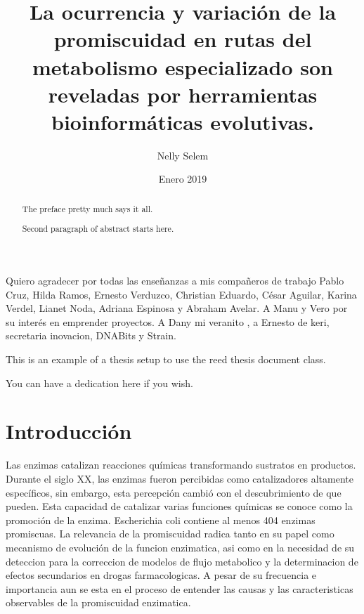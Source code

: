 \documentclass[12pt,twoside]{reedthesis}
\title{La ocurrencia y variación de la promiscuidad en rutas del metabolismo
especializado son reveladas por herramientas bioinformáticas evolutivas.}
\author{Nelly Selem}
\date{Enero 2019}
\begin{document}
      \maketitle
  
  \frontmatter %
  \pagestyle{empty} %

      \begin{acknowledgements}
      Quiero agradecer por todas las enseñanzas a mis compañeros de trabajo
      Pablo Cruz, Hilda Ramos, Ernesto Verduzco, Christian Eduardo, César
      Aguilar, Karina Verdel, Lianet Noda, Adriana Espinosa y Abraham Avelar.
      A Manu y Vero por su interés en emprender proyectos. A Dany mi veranito
      , a Ernesto de keri, secretaria inovacion, DNABits y Strain.
    \end{acknowledgements}
  
      \begin{preface}
      This is an example of a thesis setup to use the reed thesis document
      class.
    \end{preface}
  
      \hypersetup{linkcolor=black}
    \setcounter{tocdepth}{3}
    \tableofcontents
  
      \listoftables
  
      \listoffigures
  
      \begin{abstract}
      The preface pretty much says it all. \par  Second paragraph of abstract
      starts here.
    \end{abstract}
  
      \begin{dedication}
      You can have a dedication here if you wish.
    \end{dedication}
  
  \mainmatter %
  \pagestyle{fancyplain} %

  \chapter*{Introducción}\label{introduccion}
  
  Las enzimas catalizan reacciones químicas transformando sustratos en
  productos. Durante el siglo XX, las enzimas fueron percibidas como
  catalizadores altamente específicos, sin embargo, esta percepción cambió
  con el descubrimiento de que pueden. Esta capacidad de catalizar varias
  funciones químicas se conoce como la promoción de la enzima. Escherichia
  coli contiene al menos 404 enzimas promiscuas. La relevancia de la
  promiscuidad radica tanto en su papel como mecanismo de evolución de la
  funcion enzimatica, asi como en la necesidad de su deteccion para la
  correccion de modelos de flujo metabolico y la determinacion de efectos
  secundarios en drogas farmacologicas. A pesar de su frecuencia e
  importancia aun se esta en el proceso de entender las causas y las
  caracteristicas observables de la promiscuidad enzimatica.
  
\end{document}

